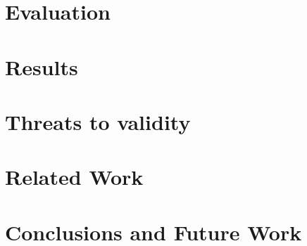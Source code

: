 \documentclass[sigconf,review, anonymous,screen]{acmart}
\begin{document}
\section{Evaluation}		
\label{sec:Evaluation}


\section{Results}
\label{sec:ExperimentalResults}



\section{Threats to validity}
\label{sec:Threats}


\section{Related Work}
\label{sec:RelatedWorks}


\section{Conclusions and Future Work}
\label{sec:Conclusions}





\end{document}
